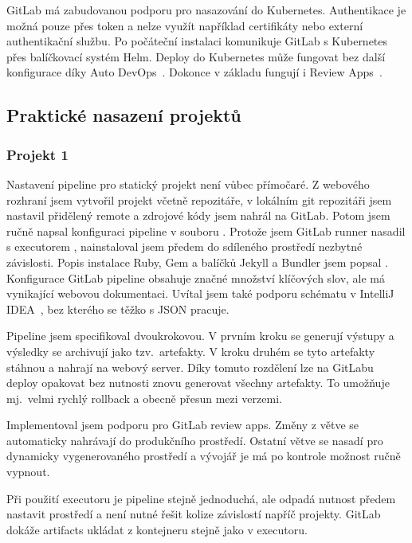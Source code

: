         GitLab má zabudovanou podporu pro nasazování do Kubernetes. Authentikace je možná pouze přes token a nelze využít například certifikáty nebo externí authentikační službu. Po počáteční instalaci komunikuje GitLab s Kubernetes přes balíčkovací systém Helm. Deploy do Kubernetes může fungovat bez další konfigurace díky Auto DevOps~\cite{gitlab-auto-devops}. Dokonce v základu fungují i Review Apps~\cite{gitlab-review-apps}.

    \subsection{Praktické nasazení projektů}
        \subsubsection{Projekt 1}
            \label{subsec:gitlab-p1}
            Nastavení pipeline pro statický projekt není vůbec přímočaré. Z webového rozhraní jsem vytvořil projekt včetně repozitáře, v lokálním git repozitáři jsem nastavil přidělený remote a zdrojové kódy jsem nahrál na GitLab. Potom jsem ručně napsal konfiguraci pipeline v souboru . Protože jsem GitLab runner nasadil s executorem , nainstaloval jsem předem do sdíleného prostředí nezbytné závislosti. Popis instalace Ruby, Gem a balíčků Jekyll a Bundler jsem popsal . Konfigurace GitLab pipeline obsahuje značné množství klíčových slov, ale má vynikající webovou dokumentaci. Uvítal jsem také podporu schématu v  IntelliJ IDEA~\cite{idea-gitlab-plugin}, bez kterého se těžko s JSON pracuje.

            Pipeline jsem specifikoval dvoukrokovou. V prvním kroku se generují výstupy a výsledky se archivují jako tzv.~artefakty. V kroku druhém  se tyto artefakty stáhnou a nahrají na webový server. Díky tomuto rozdělení lze na GitLabu deploy opakovat bez nutnosti znovu generovat všechny artefakty. To umožňuje mj.~velmi rychlý rollback a obecně přesun mezi verzemi.

            Implementoval jsem podporu pro GitLab review apps. Změny z větve  se automaticky nahrávají do produkčního prostředí. Ostatní větve se nasadí pro dynamicky vygenerovaného prostředí a vývojář je má po kontrole možnost ručně vypnout.

            Při použití  executoru je pipeline stejně jednoduchá, ale odpadá nutnost předem nastavit prostředí a není nutné řešit kolize závislostí napříč projekty. GitLab dokáže artifacts ukládat z kontejneru stejně jako v  executoru.

